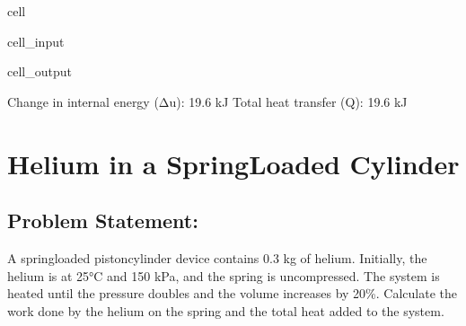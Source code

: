 \documentclass[letterpaper,10pt,english]{jupyterBook}
\begin{document}
\begin{sphinxuseclass}{cell}
\begin{sphinxVerbatimInput}
\begin{sphinxuseclass}{cell_input}
\begin{sphinxVerbatim}[commandchars=\\\{\}]
\end{sphinxVerbatim}

\end{sphinxuseclass}\end{sphinxVerbatimInput}
\begin{sphinxVerbatimOutput}

\begin{sphinxuseclass}{cell_output}
\begin{sphinxVerbatim}[commandchars=\\\{\}]
Change in internal energy (Δu): 19.6 kJ
Total heat transfer (Q): 19.6 kJ
\end{sphinxVerbatim}

\end{sphinxuseclass}\end{sphinxVerbatimOutput}

\end{sphinxuseclass}
\sphinxstepscope


\section{Helium in a Spring\sphinxhyphen{}Loaded Cylinder}
\label{\detokenize{notebooks/Chapter4/Helium_Spring_Loaded_Cylinder_Problem_6:helium-in-a-spring-loaded-cylinder}}\label{\detokenize{notebooks/Chapter4/Helium_Spring_Loaded_Cylinder_Problem_6::doc}}

\subsection{Problem Statement:}
\label{\detokenize{notebooks/Chapter4/Helium_Spring_Loaded_Cylinder_Problem_6:problem-statement}}
\sphinxAtStartPar
A spring\sphinxhyphen{}loaded piston\sphinxhyphen{}cylinder device contains 0.3 kg of helium.
Initially, the helium is at 25°C and 150 kPa, and the spring is uncompressed.
The system is heated until the pressure doubles and the volume increases by 20\%.
Calculate the work done by the helium on the spring and the total heat added to the system.
\end{document}
